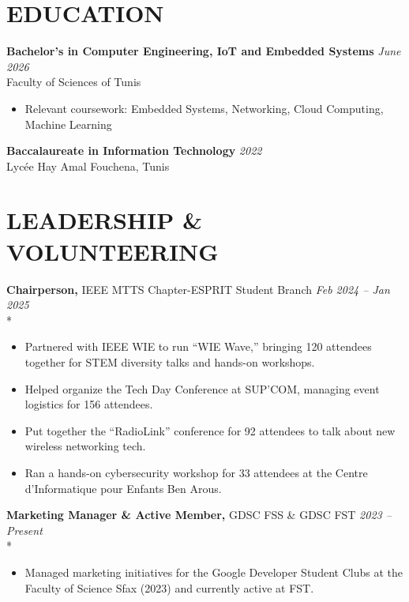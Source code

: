 \documentclass[10pt,letterpaper]{article}
\newcommand{\experienceItem}[4]{%
    \textbf{#1,} #2 \hfill \textit{#3 -- #4}\\*%
}
\begin{document}
\section*{EDUCATION}

\textbf{Bachelor's in Computer Engineering, IoT and Embedded Systems} \hfill \textit{June 2026}\\
Faculty of Sciences of Tunis
\begin{itemize}[leftmargin=*, noitemsep, topsep=0pt]
    \item Relevant coursework: Embedded Systems, Networking, Cloud Computing, Machine Learning
\end{itemize}
\vspace{4pt}

\textbf{Baccalaureate in Information Technology} \hfill \textit{2022}\\
Lycée Hay Amal Fouchena, Tunis

\section*{LEADERSHIP \& VOLUNTEERING}

\experienceItem{Chairperson}{IEEE MTTS Chapter-ESPRIT Student Branch}{Feb 2024}{Jan 2025}
\begin{itemize}[leftmargin=*, noitemsep, topsep=0pt]
    \item Partnered with IEEE WIE to run ``WIE Wave,'' bringing 120 attendees together for STEM diversity talks and hands-on workshops.
    \item Helped organize the Tech Day Conference at SUP'COM, managing event logistics for 156 attendees.
    \item Put together the ``RadioLink'' conference for 92 attendees to talk about new wireless networking tech.
    \item Ran a hands-on cybersecurity workshop for 33 attendees at the Centre d'Informatique pour Enfants Ben Arous.
\end{itemize}
\vspace{4pt}

\experienceItem{Marketing Manager \& Active Member}{GDSC FSS \& GDSC FST}{2023}{Present}
\begin{itemize}[leftmargin=*, noitemsep, topsep=0pt]
    \item Managed marketing initiatives for the Google Developer Student Clubs at the Faculty of Science Sfax (2023) and currently active at FST.
\end{itemize}
\vspace{4pt}
\end{document}
